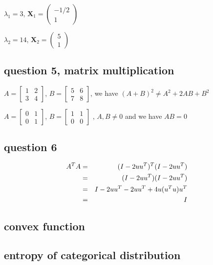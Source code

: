 \documentclass[english,11pt]{article}
\begin{document}
$\lambda_{1}=3$, $\boldsymbol{X}_{1}=\left(\begin{array}{c}
-1/2\\
1
\end{array}\right)$

$\lambda_{2}=14$, $\boldsymbol{X}_{2}=\left(\begin{array}{c}
5\\
1
\end{array}\right)$

\subsection{question 5, matrix multiplication}

$A=\left[\begin{array}{cc}
1 & 2\\
3 & 4
\end{array}\right]$, $B=\left[\begin{array}{cc}
5 & 6\\
7 & 8
\end{array}\right]$, we have $(A+B)^{2}\neq A^{2}+2AB+B^{2}$ 

$A=\left[\begin{array}{cc}
0 & 1\\
0 & 1
\end{array}\right]$, $B=\left[\begin{array}{cc}
1 & 1\\
0 & 0
\end{array}\right]$ , $A,B\neq0$ and we have $AB=0$

\subsection{question 6}

\begin{eqnarray}
A^{T}A & = & (I-2uu^{T})^{T}(I-2uu^{T}) \notag \\
 & = & (I-2uu^{T})(I-2uu^{T}) \notag \\
 & = & I-2uu^{T}-2uu^{T}+4u(u^{T}u)u^{T} \notag \\
 & = & I
\end{eqnarray}

\subsection{convex function}

\subsection{entropy of categorical distribution}
\end{document}
